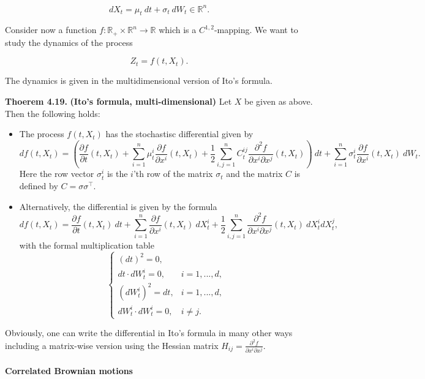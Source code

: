 \documentclass[
]{article}
\providecommand{\tightlist}{%
  \setlength{\itemsep}{0pt}\setlength{\parskip}{0pt}}
\begin{document}
\[
d X_t=\mu_t\ dt+\sigma_t\ dW_t\in\mathbb{R}^n.
\]

Consider now a function
\(f:\mathbb{R}_+\times \mathbb{R}^n\to\mathbb{R}\) which is a
\(C^{1,2}\)-mapping. We want to study the dynamics of the process

\[
Z_t=f(t,X_t).
\]

The dynamics is given in the multidimensional version of Ito's formula.

\textbf{Thoerem 4.19.} \textbf{(Ito's formula, multi-dimensional)} Let
\(X\) be given as above. Then the following holds:

\begin{itemize}
\tightlist
\item
  The process \(f(t,X_t)\) has the stochastisc differential given by \[
    df(t,X_t)=\left(\frac{\partial f}{\partial t}(t,X_t) + \sum_{i=1}^n\mu^i_t\frac{\partial f}{\partial x^i}(t,X_t) + \frac{1}{2}\sum_{i,j=1}^nC_t^{ij}\frac{\partial^2 f}{\partial x^i\partial x^j}(t,X_t)\right)\ dt+\sum_{i=1}^n\sigma^i_t\frac{\partial f}{\partial x^i}(t,X_t)\ dW_t.
    \] Here the row vector \(\sigma^i_t\) is the \(i\)'th row of the
  matrix \(\sigma_t\) and the matrix \(C\) is defined by
  \(C=\sigma\sigma^\top\).
\item
  Alternatively, the differential is given by the formula \[
    df(t,X_t)=\frac{\partial f}{\partial t}(t,X_t)\ dt + \sum_{i=1}^n\frac{\partial f}{\partial x^i}(t,X_t)\ dX^i_t + \frac{1}{2}\sum_{i,j=1}^n\frac{\partial^2 f}{\partial x^i\partial x^j}(t,X_t)\ dX^i_tdX^j_t,
    \] with the formal multiplication table \[
    \left\{\begin{matrix}(dt)^2=0,\\  dt\cdot dW_t^i=0, & i = 1,...,d,\\ (dW_t^i)^2=dt, & i=1,...,d, \\ dW_t^i\cdot dW_t^i =0, & i\ne j.\end{matrix}\right.
    \]
\end{itemize}

Obviously, one can write the differential in Ito's formula in many other
ways including a matrix-wise version using the Hessian matrix
\(H_{ij}=\frac{\partial^2 f}{\partial x^i\partial x^j}\).

\hypertarget{correlated-brownian-motions}{%
\paragraph{Correlated Brownian
motions}\label{correlated-brownian-motions}}
\end{document}
